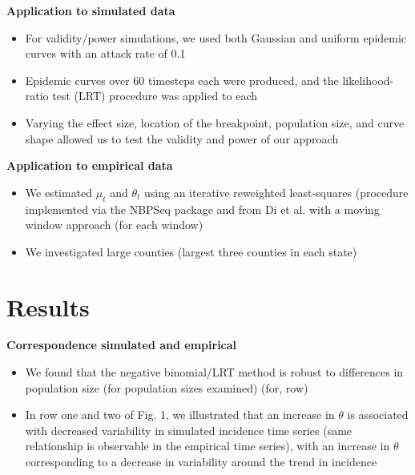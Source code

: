 \documentclass{beamer}
\begin{document}
\begin{frame}{\textbf{Application to simulated data}}
\begin{itemize}[<+-| alert@+>]
	\item For validity/power simulations, we used both Gaussian and uniform epidemic curves with an attack rate of 0.1 
	\item Epidemic curves over 60 timesteps each were produced, and the likelihood-ratio test (LRT) procedure was applied to each
	\item Varying the effect size, location of the breakpoint, population size, and curve shape allowed us to test the validity and power of our approach
\end{itemize}
\end{frame}

\begin{frame}{\textbf{Application to empirical data}}
	\begin{itemize}[<+-| alert@+>]
		\item We estimated \begin{math}\mu_t\end{math} and \begin{math}\theta_t\end{math} using an iterative reweighted least-squares (procedure implemented via the NBPSeq package\cite{NBPSeq} and from Di et al.\cite{yanming_nbp_2011} with a moving window approach (for each window)
		\item We investigated large counties (largest three counties in each state)
	\end{itemize}
\end{frame}

\section{Results}
\begin{frame}{\textbf{Correspondence simulated and empirical}}
	\begin{itemize}[<+-| alert@+>]
		\item We found that the negative binomial/LRT method is robust to differences in population size (for population sizes examined) (for, row)
		\item In row one and two of Fig. 1, we illustrated that an increase in \begin{math}\theta\end{math} is associated with decreased variability in simulated incidence time series  (same relationship is observable in the empirical time series), with an increase in \begin{math}\theta\end{math} corresponding to a decrease in variability around the trend in incidence
	\end{itemize}
\end{frame}
\end{document}
